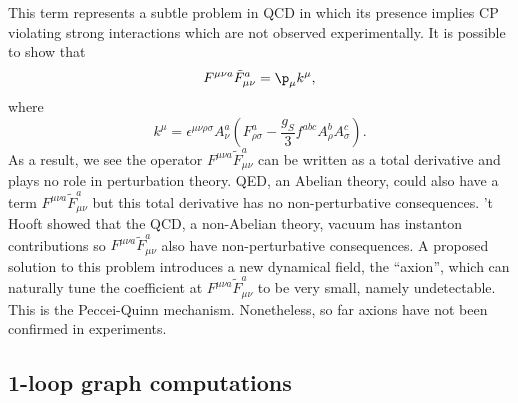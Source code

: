 This term represents a subtle problem in QCD in which its presence implies CP violating strong interactions which are not observed experimentally. It is possible to show that 
\begin{equation}
    F^{\mu\nu a}\tilde{F}^a_{\mu\nu} = \p_\mu k^\mu,
\end{equation}
where
\begin{equation}
    k^\mu = \epsilon^{\mu\nu\rho\sigma}A_\nu^a(F^a_{\rho\sigma} - \frac{g_S}{3}f^{abc}A_\rho^bA^c_\sigma).
\end{equation}
As a result, we see the operator $F^{\mu\nu a}\tilde{F}^a_{\mu\nu}$ can be written as a total derivative and plays no role in perturbation theory. QED, an Abelian theory, could also have a term $F^{\mu\nu a}\tilde{F}^a_{\mu\nu}$ but this total derivative has no non-perturbative consequences. 't Hooft showed that the QCD, a non-Abelian theory, vacuum has instanton contributions so $F^{\mu\nu a}\tilde{F}^a_{\mu\nu}$ also have non-perturbative consequences. A proposed solution to this problem introduces a new dynamical field, the ``axion'', which can naturally tune the coefficient at $F^{\mu\nu a}\tilde{F}^a_{\mu\nu}$ to be very small, namely undetectable. This is the Peccei-Quinn mechanism. Nonetheless, so far axions have not been confirmed in experiments.

\subsection{1-loop graph computations}
